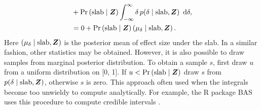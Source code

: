\documentclass[a4paper]{article}
\newcommand{\shypo}[1]{%
	\ifnum#1>0%
		\mathrm{slab}
	\else%
		\mathrm{spike}
	\fi%
}
\newcommand{\dataZ}	{\bm{Z}}
\newcommand{\probo}{\mathrm{Pr}}
\newcommand{\prob}[1]{\probo\left(#1\right)}
\newcommand{\dx}[1]{\enspace\mathrm{d}{#1}}
\newenvironment{revision}{\color{teal}}{\color{black}}
\begin{document}
\begin{revision}
\begin{align*}
	&+ \prob{\shypo{1}\mid \dataZ}\int_{-\infty}^\infty\delta \, p(\delta\mid\shypo{1}, \dataZ) \dx{\delta}, \\
	&=
	0 + 
	\prob{\shypo{1}\mid \dataZ} \left(\mu_{\delta} \mid\shypo{1}, \dataZ\right).
\end{align*}
Here $\left(\mu_{\delta} \mid\shypo{1}, \dataZ\right)$ is the posterior mean of effect size under the slab. In a similar fashion, other statistics may be obtained. However, it is also possible to draw samples from marginal posterior distribution. To obtain a sample $s$, first draw $u$ from a uniform distribution on [0, 1]. If $u<\prob{\shypo{1}\mid \dataZ}$ draw $s$ from $p(\delta\mid\shypo{1}, \dataZ)$, otherwise $s$ is zero. This approach often used when the integrals become too unwieldy to compute analytically. For example, the R package BAS uses this procedure to compute credible intervals \parencite{ClydeEtAl2011}.

\end{revision}
\end{document}
